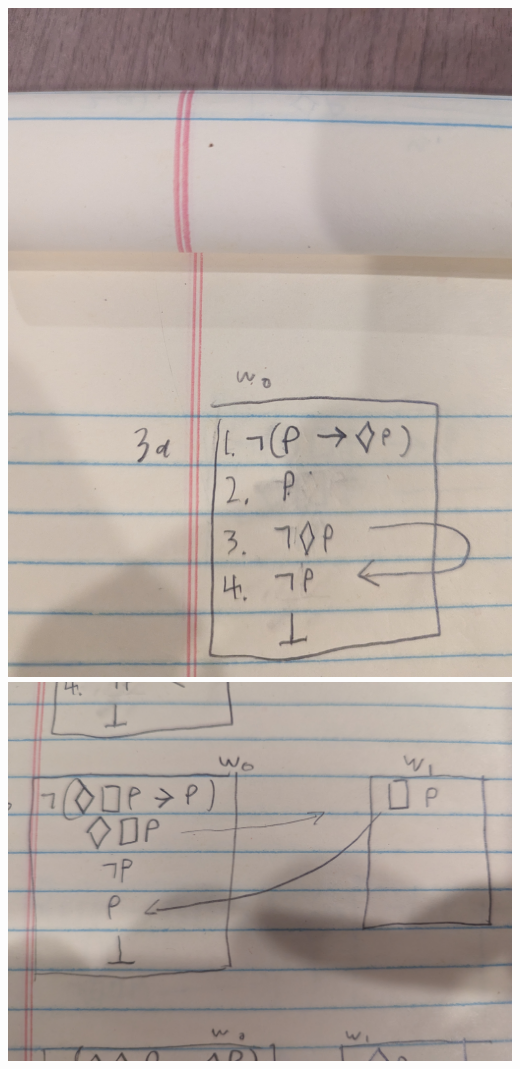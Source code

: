 \documentclass[12pt]{article}
\begin{document}
\includegraphics[width=\textwidth]{3a}
\break
\includegraphics[width=\textwidth]{3b}
\end{document}
